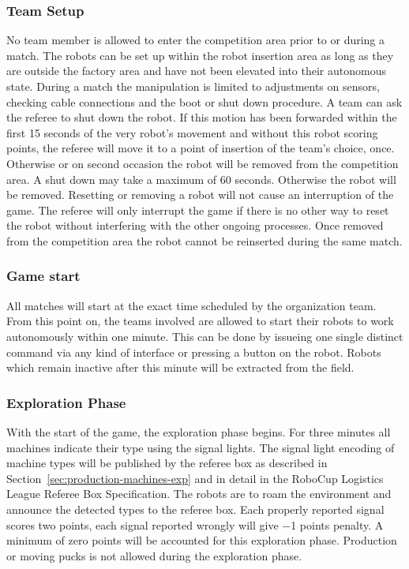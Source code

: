 \documentclass[12pt,twoside]{article}
\newcommand{\refsec}[1]{Section~\ref{#1}}
\begin{document}
\subsubsection{Team Setup}
\label{sec:team-setup}
No team member is allowed to enter the competition area prior to or
during a match. The robots can be set up within the robot insertion
area as long as they are outside the factory area and have not been
elevated into their autonomous state. During a match the manipulation
is limited to adjustments on sensors, checking cable connections and
the boot or shut down procedure. A team can ask the referee to shut
down the robot. If this motion has been forwarded within the first 15
seconds of the very robot's movement and without this robot scoring
points, the referee will move it to a point of insertion of the team's
choice, once. Otherwise or on second occasion the robot will be
removed from the competition area. A shut down may take a maximum of 60 seconds.
Otherwise the robot will be removed. Resetting or removing a robot will not
cause an interruption of the game. The referee will only interrupt the game if
there is no other way to reset the robot without interfering with the other
ongoing processes. Once removed from the competition area the robot cannot be
reinserted during the same match.

\subsubsection{Game start} \label{sec:game-start}
All matches will start at the exact time scheduled by the organization
team. From this point on, the teams involved are allowed to start their
robots to work autonomously within one minute. This can be done by
issueing one single distinct command via any kind of interface or pressing a
button on the robot. Robots which remain inactive after this minute will be
extracted from the field.

\subsubsection{Exploration Phase} \label{sec:expphase} 
With the start of the game, the exploration phase begins. For three
minutes all machines indicate their type using the signal lights. The
signal light encoding of machine types will be published by the referee box
as described in \refsec{sec:production-machines-exp} and in detail in
the RoboCup Logistics League Referee Box Specification. The robots are
to roam the environment and announce the detected types to the referee box.
Each properly reported signal scores two points, each signal reported
wrongly will give \num{-1} points penalty. A minimum of zero points
will be accounted for this exploration phase. Production or moving
pucks is not allowed during the exploration phase.
\end{document}
